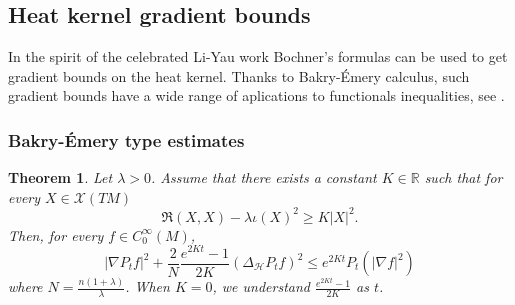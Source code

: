 \documentclass[11pt]{article}
\numberwithin{equation}{section}
\newtheorem{theorem}{Theorem}[section]
\begin{document}
\subsection{Heat kernel gradient bounds}

In the spirit of the celebrated Li-Yau work \cite{LiYau1986} Bochner's formulas can be used to get gradient bounds on the heat kernel. Thanks to Bakry-\'Emery calculus, such gradient bounds have a wide range of aplications to functionals inequalities, see \cite{BakryGentilLedoux2014}.

\subsubsection{Bakry-\'Emery type estimates}

\begin{theorem}\label{BE estimate}
    Let $\lambda  >0$. Assume that there exists a constant $K \in \mathbb{R}$ such that for every $X \in  \mathcal{X}(TM)$
        \[
        \mathfrak{R} (X,X) -\lambda \iota (X)^2 \ge K | X|^2.
        \]
        Then, for every $f \in C_0^\infty(M)$,
        \[
        | \nabla P_{t}f|^2+\frac{2}{N}\frac{e^{2Kt}-1}{2K} (\Delta_{\mathcal{H}} P_{t}f)^2 \le e^{2Kt}P_t (|\nabla f|^2)
        \]
where $N=\frac{n(1+\lambda)}{\lambda}$.        When $K=0$, we understand $\frac{e^{2Kt}-1}{2K}$ as $t$.
\end{theorem}
\end{document}
